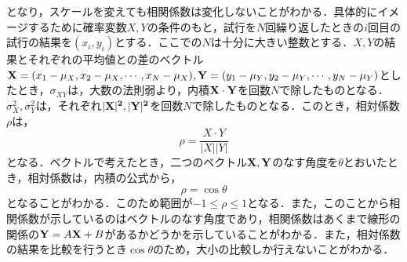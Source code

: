 \documentclass[autodetect-engine,dvipdfmx-if-dvi,ja=standard,a4paper,11pt]{bxjsarticle} %
\begin{document}
となり，スケールを変えても相関係数は変化しないことがわかる．具体的にイメージするために確率変数$X,Y$の条件のもと，試行を$N$回繰り返したときの$i$回目の試行の結果を$(x_i,y_i)$とする．ここでの$N$は十分に大きい整数とする．$X,Y$の結果とそれぞれの平均値との差のベクトル${\bf X}=(x_1-\mu_X,x_2-\mu_X,\cdots,x_N-\mu_X),{\bf Y}=(y_1-\mu_Y,y_2-\mu_Y,\cdots,y_N-\mu_Y)$としたとき，$\sigma_{XY}$は，大数の法則弱より，内積${\bf X\cdot Y}$を回数$N$で除したものとなる．$\sigma_{X}^2,\sigma_{Y}^2$は，それぞれ${\bf |X|^2,|Y|^2}$を回数$N$で除したものとなる．このとき，相対係数$\rho$は，
\begin{equation}
\rho=\frac{X\cdot Y}{|X||Y|}
\end{equation}
となる．ベクトルで考えたとき，二つのベクトル${\bf X},{\bf Y}$のなす角度を$\theta$とおいたとき，相対係数は，内積の公式から，
\begin{equation}
\rho=\cos{\theta}
\end{equation}
となることがわかる．このため範囲が$-1\leq\rho\leq1$となる．また，このことから相関係数が示しているのはベクトルのなす角度であり，相関係数はあくまで線形の関係の${\bf Y}=A{\bf X}+B$があるかどうかを示していることがわかる．また，相対係数の結果を比較を行うとき$\cos{\theta}$のため，大小の比較しか行えないことがわかる．
\end{document}
